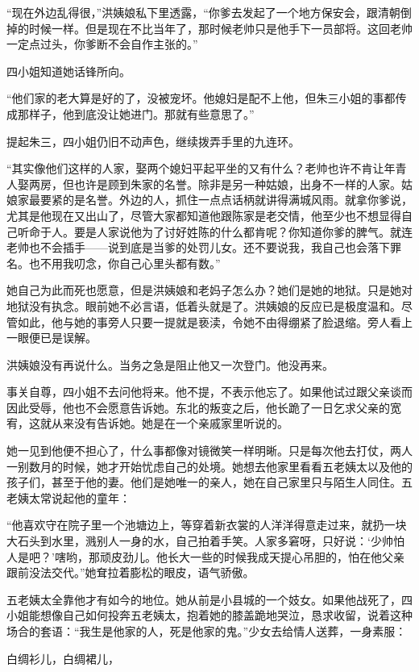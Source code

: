 \par “现在外边乱得很，”洪姨娘私下里透露，“你爹去发起了一个地方保安会，跟清朝倒掉的时候一样。但是现在不比当年了，那时候老帅只是他手下一员部将。这回老帅一定点过头，你爹断不会自作主张的。”
\par 四小姐知道她话锋所向。
\par “他们家的老大算是好的了，没被宠坏。他媳妇是配不上他，但朱三小姐的事都传成那样子，他到底没让她进门。那就有些意思了。”
\par 提起朱三，四小姐仍旧不动声色，继续拨弄手里的九连环。
\par “其实像他们这样的人家，娶两个媳妇平起平坐的又有什么？老帅也许不肯让年青人娶两房，但也许是顾到朱家的名誉。除非是另一种姑娘，出身不一样的人家。姑娘家最要紧的是名誉。外边的人，抓住一点点话柄就讲得满城风雨。就拿你爹说，尤其是他现在又出山了，尽管大家都知道他跟陈家是老交情，他至少也不想显得自己听命于人。要是人家说他为了讨好姓陈的什么都肯呢？你知道你爹的脾气。就连老帅也不会插手——说到底是当爹的处罚儿女。还不要说我，我自己也会落下罪名。也不用我叨念，你自己心里头都有数。”
\par 她自己为此而死也愿意，但是洪姨娘和老妈子怎么办？她们是她的地狱。只是她对地狱没有执念。眼前她不必言语，低着头就是了。洪姨娘的反应已是极度温和。尽管如此，他与她的事旁人只要一提就是亵渎，令她不由得绷紧了脸退缩。旁人看上一眼便已是误解。
\par 洪姨娘没有再说什么。当务之急是阻止他又一次登门。他没再来。
\par 事关自尊，四小姐不去问他将来。他不提，不表示他忘了。如果他试过跟父亲谈而因此受辱，他也不会愿意告诉她。东北的叛变之后，他长跪了一日乞求父亲的宽宥，这就从来没有告诉她。她是在一个亲戚家里听说的。
\par 她一见到他便不担心了，什么事都像对镜微笑一样明晰。只是每次他去打仗，两人一别数月的时候，她才开始忧虑自己的处境。她想去他家里看看五老姨太以及他的孩子们，甚至于他的妻。他们是她唯一的亲人，她在自己家里只与陌生人同住。五老姨太常说起他的童年：
\par “他喜欢守在院子里一个池塘边上，等穿着新衣裳的人洋洋得意走过来，就扔一块大石头到水里，溅别人一身的水，自己拍着手笑。人家多窘呀，只好说：‘少帅怕人是吧？’嗐哟，那顽皮劲儿。他长大一些的时候我成天提心吊胆的，怕在他父亲跟前没法交代。”她耷拉着膨松的眼皮，语气骄傲。
\par 五老姨太全靠他才有如今的地位。她从前是小县城的一个妓女。如果他战死了，四小姐能想像自己如何投奔五老姨太，抱着她的膝盖跪地哭泣，恳求收留，说着这种场合的套语：“我生是他家的人，死是他家的鬼。”少女去给情人送葬，一身素服：
\par 白绸衫儿，白绸裙儿，
